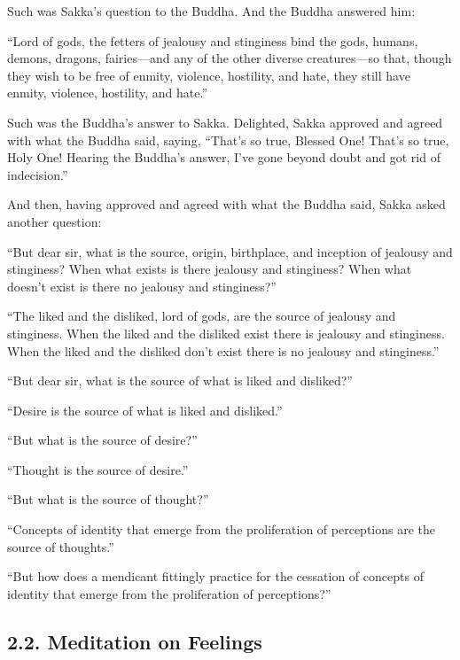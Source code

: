 \documentclass[12pt,openany]{book}%
\begin{document}
Such was Sakka’s question to the Buddha. And the Buddha answered him: 

“Lord of gods, the fetters of jealousy and stinginess bind the gods, humans, demons, dragons, fairies—and any of the other diverse creatures—so that, though they wish to be free of enmity, violence, hostility, and hate, they still have enmity, violence, hostility, and hate.” 

Such was the Buddha’s answer to Sakka. Delighted, Sakka approved and agreed with what the Buddha said, saying, “That’s so true, Blessed One! That’s so true, Holy One! Hearing the Buddha’s answer, I’ve gone beyond doubt and got rid of indecision.” 

And then, having approved and agreed with what the Buddha said, Sakka asked another question: 

“But dear sir, what is the source, origin, birthplace, and inception of jealousy and stinginess? When what exists is there jealousy and stinginess? When what doesn’t exist is there no jealousy and stinginess?” 

“The liked and the disliked, lord of gods, are the source of jealousy and stinginess. When the liked and the disliked exist there is jealousy and stinginess. When the liked and the disliked don’t exist there is no jealousy and stinginess.” 

“But dear sir, what is the source of what is liked and disliked?” 

“Desire is the source of what is liked and disliked.” 

“But what is the source of desire?” 

“Thought is the source of desire.” 

“But what is the source of thought?” 

“Concepts of identity that emerge from the proliferation of perceptions are the source of thoughts.” 

“But how does a mendicant fittingly practice for the cessation of concepts of identity that emerge from the proliferation of perceptions?” 

\subsection*{2.2. Meditation on Feelings }
\end{document}
